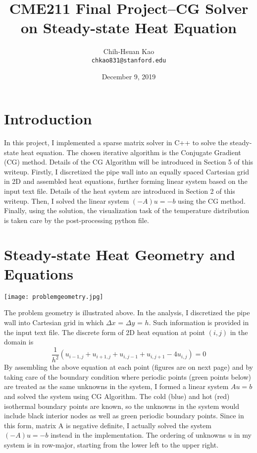 \documentclass{article}
\title{CME211 Final Project--CG Solver on Steady-state Heat Equation}
\author{
  Chih-Hsuan Kao\\
  \texttt{chkao831@stanford.edu}
}
\affil{Stanford University}
\date{December 9, 2019}
\begin{document}
\maketitle

\section{Introduction}
In this project, I implemented a sparse matrix solver in C++ to solve the steady-state heat equation. The chosen iterative algorithm is the Conjugate Gradient (CG) method. Details of the CG Algorithm will be introduced in Section 5 of this writeup. Firstly, I discretized the pipe wall into an equally spaced Cartesian grid in 2D and assembled heat equations, further forming linear system based on the input text file. Details of the heat system are introduced in Section 2 of this writeup. Then, I solved the linear system $(-A)u = -b$ using the CG method. Finally, using the solution, the visualization task of the temperature distribution is taken care by the post-processing python file. 

\section{Steady-state Heat Geometry and Equations}
\begin{center}
\texttt{[image: problemgeometry.jpg]}
\end{center}
The problem geometry is illustrated above. In the analysis, I discretized the pipe wall into Cartesian grid in which $\Delta$$x$ = $\Delta$$y$ = $h$. Such information is provided in the input text file. The discrete form of 2D heat equation at point $(i,j)$ in the domain is 
\[
  \frac{1}
       {h^2}
    (u_{i-1,j}+u_{i+1,j}+u_{i,j-1}+u_{i,j+1}-4u_{i,j} )=0
\]
By assembling the above equation at each point (figures are on next page) and by taking care of the boundary condition where periodic points (green points below) are treated as the same unknowns in the system, I formed a linear system $Au = b$ and solved the system using CG Algorithm. The cold (blue) and hot (red) isothermal boundary points are known, so the unknowns in the system would include black interior nodes as well as green periodic boundary points. Since in this form, matrix A is negative definite, I actually solved the system $(-A)u = -b$ instead in the implementation. The ordering of unknowns $u$ in my system is in row-major, starting from the lower left to the upper right. 
\end{document}
